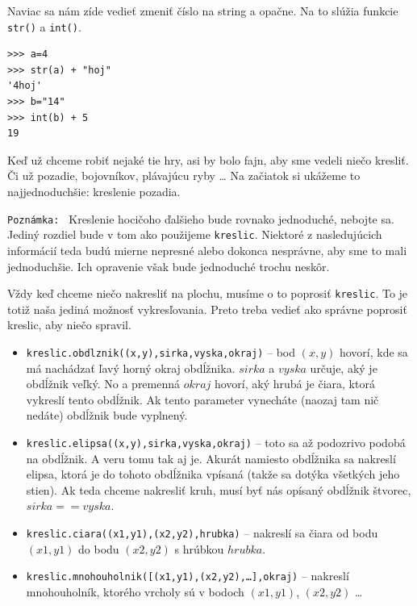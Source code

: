 Naviac sa nám zíde vedieť zmeniť číslo na string a opačne. Na to slúžia funkcie \texttt{str()} a \texttt{int()}.

\begin{lstlisting}
>>> a=4
>>> str(a) + "hoj"
'4hoj'
>>> b="14"
>>> int(b) + 5
19
\end{lstlisting}


Keď už chceme robiť nejaké tie hry, asi by bolo fajn, aby sme vedeli niečo kresliť. Či už pozadie, bojovníkov, plávajúcu ryby \dots
Na začiatok si ukážeme to najjednoduchšie: kreslenie pozadia.

\texttt{Poznámka: } Kreslenie hocičoho ďalšieho bude rovnako jednoduché, nebojte sa. Jediný rozdiel bude v tom ako použijeme \texttt{kreslic}.
Niektoré z nasledujúcich informácií teda budú mierne nepresné alebo dokonca nesprávne, aby sme to mali jednoduchšie. Ich opravenie však bude
jednoduché trochu neskôr.


Vždy keď chceme niečo nakresliť na plochu, musíme o to poprosiť \texttt{kreslic}. To je totiž naša jediná možnosť vykresľovania. Preto treba vedieť
ako správne poprosiť kreslic, aby niečo spravil.

\begin{itemize}
	\item \texttt{kreslic.obdlznik((x,y),sirka,vyska,okraj)} -- bod $(x,y)$ hovorí, kde sa má nachádzať ľavý horný okraj obdĺžnika. $sirka$ a $vyska$
		určuje, aký je obdĺžnik veľký. No a premenná $okraj$ hovorí, aký hrubá je čiara, ktorá vykreslí tento obdĺžnik. Ak tento parameter
		vynecháte (naozaj tam nič nedáte) obdĺžnik bude vyplnený.
	\item \texttt{kreslic.elipsa((x,y),sirka,vyska,okraj)} -- toto sa až podozrivo podobá na obdĺžnik. A veru tomu tak aj je. Akurát namiesto obdĺžnika
		sa nakreslí elipsa, ktorá je do tohoto obdĺžnika vpísaná (takže sa dotýka všetkých jeho stien). Ak teda chceme nakresliť kruh, musí
		byť nás opísaný obdĺžnik štvorec, $sirka == vyska$.
	\item \texttt{kreslic.ciara((x1,y1),(x2,y2),hrubka)} -- nakreslí sa čiara od bodu $(x1,y1)$ do bodu $(x2,y2)$ s hrúbkou $hrubka$.
	\item \texttt{kreslic.mnohouholnik([(x1,y1),(x2,y2),\dots],okraj)} -- nakreslí mnohouholník, ktorého vrcholy sú v bodoch $(x1,y1)$, $(x2,y2)$ \dots
\end{itemize}

